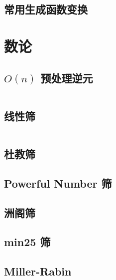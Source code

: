 \documentclass[a4paper, twoside]{article}
\begin{document}
\begin{multicols}{2}
			\subsection{常用生成函数变换}
				

		\newpage
		\section{数论}

			\subsection{$O(n)$ 预处理逆元}
				\inputminted{cpp}{../src/numbertheory/O(n)求逆元.cpp}

			\subsection{线性筛}
				\inputminted{cpp}{../src/numbertheory/扩展线性筛.cpp}

			\subsection{杜教筛}
				
			
			\subsection{Powerful Number 筛}
				

			\subsection{洲阁筛}
				

			\subsection{min25 筛}
				


			\subsection{Miller-Rabin}
				\inputminted{cpp}{../src/numbertheory/Miller-Rabin.cpp}


\end{multicols}
\end{document}
